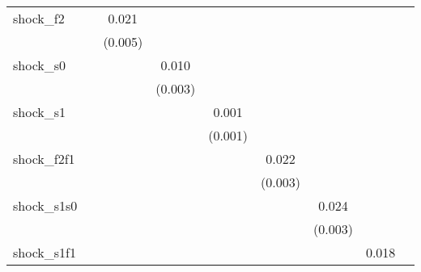 {\begin{tabular}{l*{8}{c}}
\addlinespace
shock\_f2    &                     &       0.021\sym{***}&                     &                     &                     &                     &                     &                     \\
            &                     &     (0.005)         &                     &                     &                     &                     &                     &                     \\
\addlinespace
shock\_s0    &                     &                     &       0.010\sym{***}&                     &                     &                     &                     &                     \\
            &                     &                     &     (0.003)         &                     &                     &                     &                     &                     \\
\addlinespace
shock\_s1    &                     &                     &                     &       0.001         &                     &                     &                     &                     \\
            &                     &                     &                     &     (0.001)         &                     &                     &                     &                     \\
\addlinespace
shock\_f2f1  &                     &                     &                     &                     &       0.022\sym{***}&                     &                     &                     \\
            &                     &                     &                     &                     &     (0.003)         &                     &                     &                     \\
\addlinespace
shock\_s1s0  &                     &                     &                     &                     &                     &       0.024\sym{***}&                     &                     \\
            &                     &                     &                     &                     &                     &     (0.003)         &                     &                     \\
\addlinespace
shock\_s1f1  &                     &                     &                     &                     &                     &                     &       0.018\sym{***}&                     \\

\end{tabular}}
